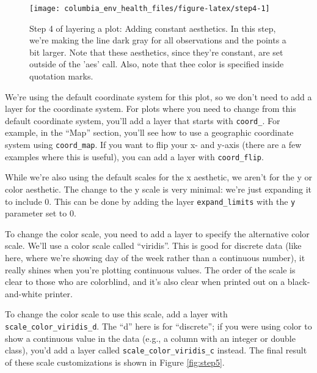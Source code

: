 \documentclass[]{tufte-book}
\begin{document}
\begin{figure}
\texttt{[image: columbia\_env\_health\_files/figure-latex/step4-1]} \caption[Step 4 of layering a plot]{Step 4 of layering a plot: Adding constant aesthetics. In this step, we're making the line dark gray for all observations and the points a bit larger. Note that these aesthetics, since they're constant, are set outside of the 'aes' call. Also, note that thee color is specified inside quotation marks.}\label{fig:step4}
\end{figure}

We're using the default coordinate system for this plot, so we don't need to add
a layer for the coordinate system. For plots where you need to change from this
default coordinate system, you'll add a layer that starts with \texttt{coord\_}. For example,
in the ``Map'' section, you'll see how to use a geographic coordinate system using
\texttt{coord\_map}. If you want to flip your x- and y-axis (there are a few examples where
this is useful), you can add a layer with \texttt{coord\_flip}.

While we're also using the default scales for the x aesthetic, we aren't for
the y or color aesthetic. The change to the y scale is very minimal: we're just
expanding it to include 0. This can be done by adding the layer \texttt{expand\_limits}
with the \texttt{y} parameter set to 0.

To change the color scale, you need to add a layer to specify
the alternative color scale. We'll use a color scale called
``viridis''. This is good for discrete data (like here, where we're showing day of
the week rather than a continuous number), it really shines when you're plotting
continuous values. The order of the scale is clear to those who are colorblind, and
it's also clear when printed out on a black-and-white printer.

To change the color scale to use this scale, add a layer with \texttt{scale\_color\_viridis\_d}.
The ``d'' here is for ``discrete''; if you were using color to show a continuous
value in the data (e.g., a column with an integer or double class), you'd
add a layer called \texttt{scale\_color\_viridis\_c} instead. The final result of these
scale customizations is shown in Figure \ref{fig:step5}.
\end{document}
